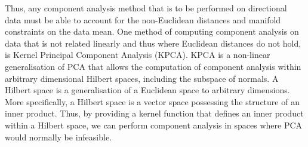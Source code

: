 \begin{figure}[t]
\begin{minipage}[t]{.45\textwidth}
\label{fig:singl_img_united_nations}
	\end{minipage}
\end{figure}
Thus, any component analysis method that is to be performed on directional data
must be able to account for the non-Euclidean distances and manifold constraints
on the data mean. One method of computing component analysis on data that is
not related linearly and thus where Euclidean distances do not hold, is
Kernel Principal Component Analysis (KPCA).
KPCA is a non-linear generalisation of PCA that allows the computation
of component analysis within arbitrary dimensional Hilbert spaces,
including the subspace of normals. A Hilbert space is a generalisation
of a Euclidean space to arbitrary dimensions. More specifically, a Hilbert
space is a vector space possessing the structure of an inner
product. Thus, by providing a kernel function that defines
an inner product within a Hilbert space, we can perform component analysis in
spaces where PCA would normally be infeasible.

